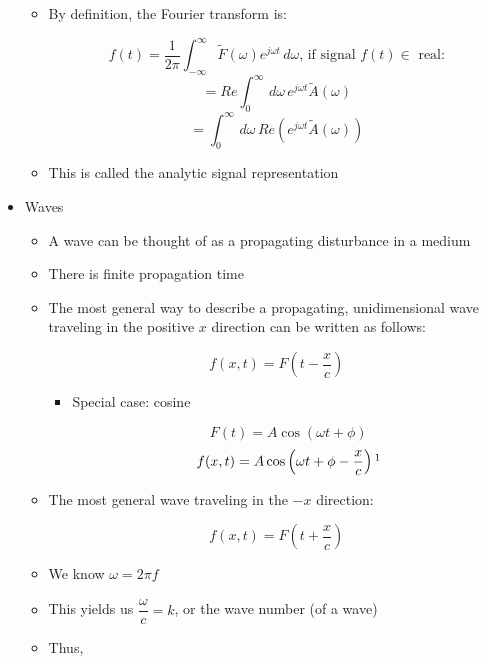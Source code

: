 \begin{itemize}
\begin{itemize}
      \item By definition, the Fourier transform is:

        $$f(t)=\frac{1}{2\pi}\int_{-\infty}^{\infty}\tilde{F}(\omega)e^{j\omega t}\,d\omega\text{, if signal $f(t)\in$ real:}$$
        $$=Re\int_0^{\infty}\,d\omega\,e^{j\omega t}\tilde{A}(\omega)$$
        $$=\int_0^{\infty}\,d\omega\,Re\left( e^{j\omega t} \tilde{A}(\omega)\right)$$

      \item This is called the analytic signal representation

    \end{itemize}

  \item Waves

    \begin{itemize}

      \item A wave can be thought of as a propagating disturbance in a medium

      \item There is finite propagation time

      \item The most general way to describe a propagating, unidimensional wave traveling in the positive $x$ direction can be written as follows:

        $$f(x,t)=F\left(t-\frac{x}{c}\right)$$

        \begin{itemize}

          \item Special case: cosine

            $$F(t)=A\cos(\omega t+\phi)$$
            $$f(x,t)=A\cos\left(\omega t + \phi - \frac{x}{c}\right)\footnote{This wave is in the $+x$ direction}$$

        \end{itemize}

      \item The most general wave traveling in the $-x$ direction:

        $$f(x,t)=F\left( t+\frac{x}{c} \right)$$

      \item We know $\omega=2\pi f$

      \item This yields us $\dfrac{\omega}{c}=k$, or the wave number (of a wave)

      \item Thus,


\end{itemize}
\end{itemize}
